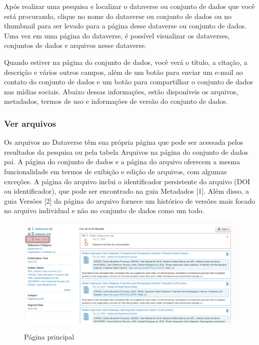 \documentclass[12pt,hidelinks]{article}
\begin{document}
\qquad Após realizar uma pesquisa e localizar o dataverse ou conjunto de dados que você está procurando, clique no nome do dataverse ou conjunto de dados ou no thumbnail para ser levado para a página desse dataverse ou conjunto de dados. Uma vez em uma página do dataverse, é possível visualizar os dataverses, conjuntos de dados e arquivos nesse dataverse.

Quando estiver na página do conjunto de dados, você verá o título, a citação, a descrição e vários outros campos, além de um botão para enviar um e-mail ao contato do conjunto de dados e um botão para compartilhar o conjunto de dados nas mídias sociais. Abaixo dessas informações, estão disponíveis os arquivos, metadados, termos de uso e informações de versão do conjunto de dados.
	    
	    \subsubsection{Ver arquivos}
	    
\qquad Os arquivos no Dataverse têm sua própria página que pode ser acessada pelos resultados da pesquisa ou pela tabela Arquivos na página do conjunto de dados pai. A página do conjunto de dados e a página do arquivo oferecem a mesma funcionalidade em termos de exibição e edição de arquivos, com algumas exceções. A página do arquivo inclui o identificador persistente do arquivo (DOI ou identificador), que pode ser encontrado na guia Metadados [1]. Além disso, a guia Versões [2] da página do arquivo fornece um histórico de versões mais focado no arquivo individual e não no conjunto de dados como um todo.
	    
\begin{figure}[H]
\caption{Página principal}
\centering
    \includegraphics[width=1.0\textwidth]{imagens/USAAAA.png}
    \label{print1}
\end{figure}
   
\end{document}
